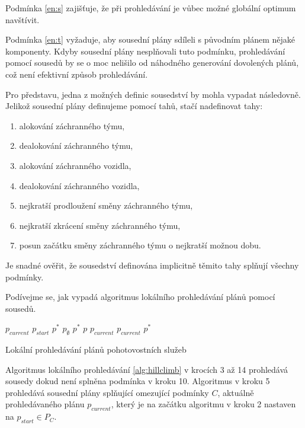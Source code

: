 Podmínka  \ref{en:s} zajišťuje, že při prohledávání je vůbec možné globální optimum navštívit.

Podmínka \ref{en:t} vyžaduje, aby sousední plány sdíleli s původním plánem nějaké komponenty. 
Kdyby sousední plány nesplňovali tuto podmínku, prohledávání pomocí sousedů by se o moc nelišilo od náhodného
generování dovolených plánů, což není efektivní způsob prohledávání.

Pro představu, jedna z možných definic sousedství by mohla vypadat následovně.
Jelikož sousední plány definujeme pomocí tahů, stačí nadefinovat tahy:
  \begin{enumerate}
    \item alokování záchranného týmu,
    \item dealokování záchranného týmu,
    \item alokování záchranného vozidla,
    \item dealokování záchranného vozidla,
    \item nejkratší prodloužení směny záchranného týmu,
    \item nejkratší zkrácení směny záchranného týmu,
    \item posun začátku směny záchranného týmu o nejkratší možnou dobu.
  \end{enumerate}

Je snadné ověřit, že sousedství definována implicitně těmito tahy splňují všechny podmínky.

Podívejme se, jak vypadá algoritmus lokálního prohledávání plánů pomocí sousedů.

\begin{algorithm}[H]
  \begin{algorithmic}[1]
    \State $p_{current}$ \gets $p_{start}$
      \State $p^*$ \gets $p_{\emptyset}$ 
          \State $p^*$ \gets $p$
        \EndIf
      \EndFor
        \State \Return $p_{current}$
      \EndIf
      \State $p_{current}$ \gets $p^*$
    \EndWhile
  \EndFunction
  \end{algorithmic}
  \caption{Lokální prohledávání plánů pohotovostních služeb}
  \label{alg:hillclimb}
\end{algorithm}

Algoritmus lokálního prohledávání \ref{alg:hillclimb} v krocích 3 až 14 prohledává sousedy dokud není splněna podmínka v kroku 10.
Algoritmus v kroku 5 prohledává sousední plány splňující omezující podmínky $C$,
aktuálně prohledávaného plánu $p_{current}$, který je na začátku algoritmu v kroku 2 nastaven na $p_{start} \in P_C$.

